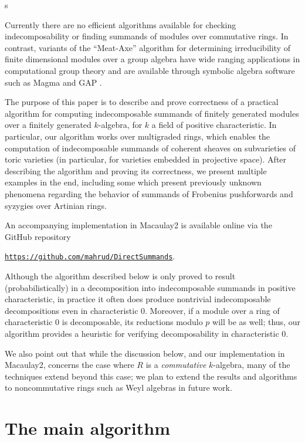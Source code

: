 s\documentclass{article}
\numberwithin{equation}{section}
\theoremstyle{theorem}
\numberwithin{thm}{section}
\theoremstyle{definition}
\begin{document}
Currently there are no efficient algorithms available for checking indecomposability or finding summands of modules over commutative rings. In contrast, variants of the ``Meat-Axe'' algorithm for determining irreducibility of finite dimensional modules over a group algebra have wide ranging applications in computational group theory \cite{Parker84,HR94,Holt98} and are available through symbolic algebra software such as Magma and GAP \cite{MAGMA,GAP}.

The purpose of this paper is to describe and prove correctness of a practical algorithm for computing indecomposable summands of finitely generated modules over a finitely generated $k$-algebra, for $k$ a field of positive characteristic.
In particular, our algorithm works over multigraded rings, which enables the computation of indecomposable summands of coherent sheaves on subvarieties of toric varieties (in particular, for varieties embedded in projective space).
After describing the algorithm and proving its correctness, we present multiple examples in the end, including some which present previously unknown phenomena regarding the behavior of summands of Frobenius pushforwards and syzygies over Artinian rings.

An accompanying implementation in Macaulay2 is available online via the GitHub repository 
\centerline{
  \href{https://github.com/mahrud/DirectSummands}
  {\texttt{https://github.com/mahrud/DirectSummands}}.}


\begin{rem}
  Although the algorithm described below is only proved to result (probabilistically) in a decomposition into indecomposable summands in positive characteristic, in practice it often does produce nontrivial indecomposable decompositions even in characteristic 0. Moreover, if a module over a ring of characteristic 0 is decomposable, its reductions modulo $p$ will be as well; thus, our algorithm provides a heuristic for verifying decomposability in characteristic 0. 

  We also point out that while the discussion below, and our implementation in Macaulay2, concerns the case where $R$ is a \emph{commutative} $k$-algebra, many of the techniques extend beyond this case; we plan to extend the results and algorithms to noncommutative rings such as Weyl algebras in future work.
\end{rem}

\section{The main algorithm}
\end{document}
